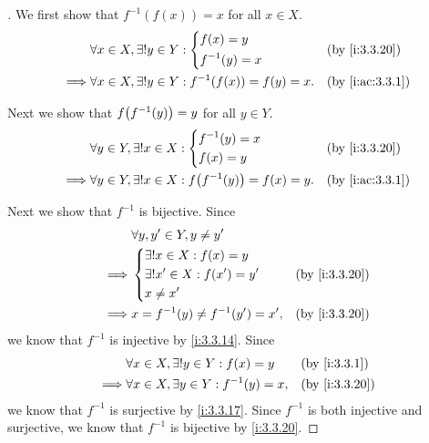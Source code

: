 \begin{proof}[]
  We first show that \(f^{-1}(f(x)) = x\) for all \(x \in X\).
  \begin{align*}
             & \forall x \in X, \exists! y \in Y : \begin{dcases}
                                                     f(x) = y \\
                                                     f^{-1}(y) = x
                                                   \end{dcases}              &  & \by{i:3.3.20}     \\
    \implies & \forall x \in X, \exists! y \in Y : f^{-1}\pa{f(x)} = f(y) = x. &  & \by{i:ac:3.3.1}
  \end{align*}

  Next we show that \(f\pa{f^{-1}(y)} = y\) for all \(y \in Y\).
  \begin{align*}
             & \forall y \in Y, \exists! x \in X : \begin{dcases}
                                                     f^{-1}(y) = x \\
                                                     f(x) = y
                                                   \end{dcases}              &  & \by{i:3.3.20}     \\
    \implies & \forall y \in Y, \exists! x \in X : f\pa{f^{-1}(y)} = f(x) = y. &  & \by{i:ac:3.3.1}
  \end{align*}

  Next we show that \(f^{-1}\) is bijective.
  Since
  \begin{align*}
             & \forall y, y' \in Y, y \neq y'                         \\
    \implies & \begin{dcases}
                 \exists! x \in X : f(x) = y    \\
                 \exists! x' \in X : f(x') = y' \\
                 x \neq x'
               \end{dcases}   &  & \by{i:3.3.20}                      \\
    \implies & x = f^{-1}(y) \neq f^{-1}(y') = x', &  & \by{i:3.3.20}
  \end{align*}
  we know that \(f^{-1}\) is injective by \cref{i:3.3.14}.
  Since
  \begin{align*}
             & \forall x \in X, \exists! y \in Y : f(x) = y      &  & \by{i:3.3.1}  \\
    \implies & \forall x \in X, \exists y \in Y : f^{-1}(y) = x, &  & \by{i:3.3.20}
  \end{align*}
  we know that \(f^{-1}\) is surjective by \cref{i:3.3.17}.
  Since \(f^{-1}\) is both injective and surjective, we know that \(f^{-1}\) is bijective by \cref{i:3.3.20}.


\end{proof}
